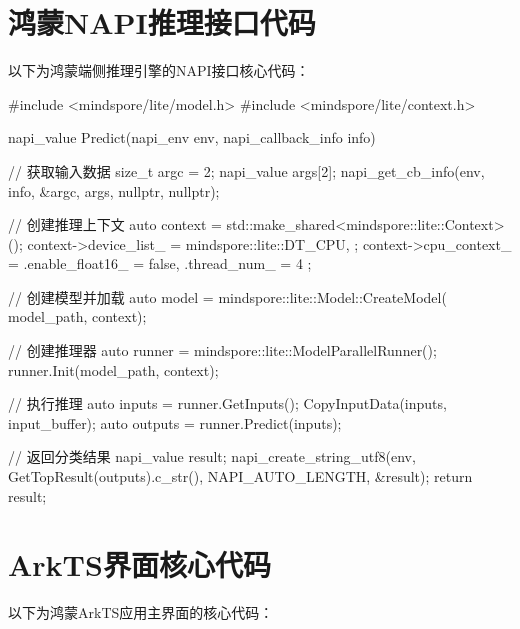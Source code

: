 \section{鸿蒙NAPI推理接口代码}

以下为鸿蒙端侧推理引擎的NAPI接口核心代码：

\begin{codeblock}[language=C++, caption={NAPI推理接口代码}]
#include <mindspore/lite/model.h>
#include <mindspore/lite/context.h>

napi_value Predict(napi_env env, napi_callback_info info) {
    // 获取输入数据
    size_t argc = 2;
    napi_value args[2];
    napi_get_cb_info(env, info, &argc, args, nullptr, nullptr);

    // 创建推理上下文
    auto context = std::make_shared<mindspore::lite::Context>();
    context->device_list_ = {{mindspore::lite::DT_CPU, {}}};
    context->cpu_context_ = {
        .enable_float16_ = false,
        .thread_num_ = 4
    };

    // 创建模型并加载
    auto model = mindspore::lite::Model::CreateModel(
        model_path, context);

    // 创建推理器
    auto runner = mindspore::lite::ModelParallelRunner();
    runner.Init(model_path, context);

    // 执行推理
    auto inputs = runner.GetInputs();
    CopyInputData(inputs, input_buffer);
    auto outputs = runner.Predict(inputs);

    // 返回分类结果
    napi_value result;
    napi_create_string_utf8(env,
        GetTopResult(outputs).c_str(),
        NAPI_AUTO_LENGTH, &result);
    return result;
}
\end{codeblock}

\section{ArkTS界面核心代码}

以下为鸿蒙ArkTS应用主界面的核心代码：


